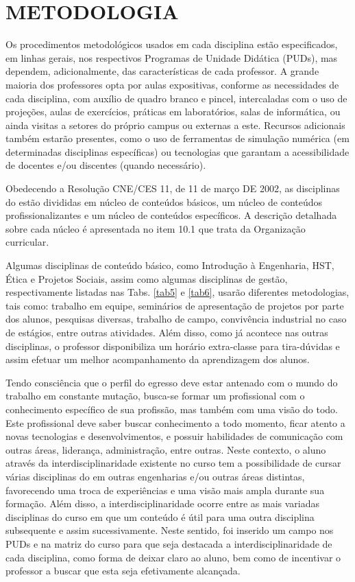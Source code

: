\documentclass{paper}
\begin{document}
\clearpage\section{METODOLOGIA}

Os procedimentos metodológicos usados em cada disciplina estão especificados, em linhas gerais, nos respectivos Programas de Unidade Didática (PUDs), mas dependem, adicionalmente, das características de cada professor. A grande maioria dos professores opta por aulas expositivas, conforme as necessidades de cada disciplina, com auxílio de quadro branco e pincel, intercaladas com o uso de projeções, aulas de exercícios, práticas em laboratórios, salas de informática, ou ainda visitas a setores do próprio campus ou externas a este. Recursos adicionais também estarão presentes, como o uso de ferramentas de simulação numérica (em determinadas disciplinas específicas) ou tecnologias que garantam a acessibilidade de docentes e/ou discentes (quando necessário).

Obedecendo a Resolução CNE/CES 11, de 11 de março DE 2002, as disciplinas do \NOMECURSO estão divididas em núcleo de conteúdos básicos, um núcleo de conteúdos profissionalizantes e um núcleo de conteúdos específicos. A descrição detalhada sobre cada núcleo é apresentada no item 10.1 que trata da Organização curricular.

Algumas disciplinas de conteúdo básico, como Introdução à Engenharia, HST, Ética e Projetos Sociais, assim como algumas disciplinas de gestão, respectivamente listadas nas Tabs. \ref{tab5} e \ref{tab6}, usarão diferentes metodologias, tais como: trabalho em equipe, seminários de apresentação de projetos por parte dos alunos, pesquisas diversas, trabalho de campo, convivência industrial no caso de estágios, entre outras atividades. Além disso, como já acontece nas outras disciplinas, o professor disponibiliza um horário extra-classe para tira-dúvidas e assim efetuar um melhor acompanhamento da aprendizagem dos alunos.

Tendo consciência que o perfil do egresso deve estar antenado com o mundo do trabalho em constante mutação, busca-se formar um profissional com o conhecimento específico de sua profissão, mas também com uma visão do todo. Este profissional deve saber buscar conhecimento a todo momento, ficar atento a novas tecnologias e desenvolvimentos, e possuir habilidades de comunicação com outras áreas, liderança, administração, entre outras. Neste contexto, o aluno através da interdisciplinaridade existente no curso tem a possibilidade de cursar várias disciplinas do \NOMECURSO em outras engenharias e/ou outras áreas distintas, favorecendo uma troca de experiências e uma visão mais ampla durante sua formação. Além disso, a interdisciplinaridade ocorre entre as mais variadas disciplinas do curso em que um conteúdo é útil para uma outra disciplina subsequente e assim sucessivamente. Neste sentido, foi inserido um campo nos PUDs e na matriz do curso para que seja destacada a interdisciplinaridade de cada disciplina, como forma de deixar claro ao aluno, bem como de incentivar o professor a buscar que esta seja efetivamente alcançada.
\end{document}
